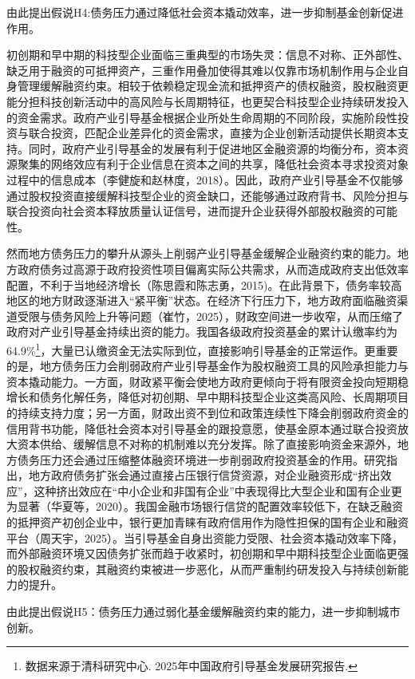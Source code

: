 由此提出假说H4:债务压力通过降低社会资本撬动效率，进一步抑制基金创新促进作用。

初创期和早中期的科技型企业面临三重典型的市场失灵：信息不对称、正外部性、缺乏用于融资的可抵押资产，三重作用叠加使得其难以仅靠市场机制作用与企业自身管理缓解融资约束。相较于依赖稳定现金流和抵押资产的债权融资，股权融资更能分担科技创新活动中的高风险与长周期特征，也更契合科技型企业持续研发投入的资金需求。政府产业引导基金根据企业所处生命周期的不同阶段，实施阶段性投资与联合投资，匹配企业差异化的资金需求，直接为企业创新活动提供长期资本支持。同时，政府产业引导基金的发展有利于促进地区金融资源的均衡分布，资本资源聚集的网络效应有利于企业信息在资本之间的共享，降低社会资本寻求投资对象过程中的信息成本（李健旋和赵林度，2018）。因此，政府产业引导基金不仅能够通过股权投资直接缓解科技型企业的资金缺口，还能够通过政府背书、风险分担与联合投资向社会资本释放质量认证信号，进而提升企业获得外部股权融资的可能性。

然而地方债务压力的攀升从源头上削弱产业引导基金缓解企业融资约束的能力。地方政府债务过高源于政府投资性项目偏离实际公共需求，从而造成政府支出低效率配置，不利于当地经济增长（陈思霞和陈志勇，2015)。在此背景下，债务率较高地区的地方财政逐渐进入“紧平衡”状态。在经济下行压力下，地方政府面临融资渠道受限与债务风险上升等问题（崔竹，2025），财政空间进一步收窄，从而压缩了政府对产业引导基金持续出资的能力。我国各级政府投资基金的累计认缴率约为64.9\%\footnote[1]{\hspace*{2em}数据来源于清科研究中心. 2025年中国政府引导基金发展研究报告.}，大量已认缴资金无法实际到位，直接影响引导基金的正常运作。更重要的是，地方债务压力会削弱政府产业引导基金作为股权融资工具的风险承担能力与资本撬动能力。一方面，财政紧平衡会使地方政府更倾向于将有限资金投向短期稳增长和债务化解任务，降低对初创期、早中期科技型企业这类高风险、长周期项目的持续支持力度；另一方面，财政出资不到位和政策连续性下降会削弱政府资金的信用背书功能，降低社会资本对引导基金的跟投意愿，使基金原本通过联合投资放大资本供给、缓解信息不对称的机制难以充分发挥。除了直接影响资金来源外，地方债务压力还会通过压缩整体融资环境进一步削弱政府投资基金的作用。研究指出，地方政府债务扩张会通过直接占压银行信贷资源，对企业融资形成“挤出效应”，这种挤出效应在“中小企业和非国有企业”中表现得比大型企业和国有企业更为显著（华夏等，2020）。我国金融市场银行信贷的配置效率较低下，在缺乏融资的抵押资产初创企业中，银行更加青睐有政府信用作为隐性担保的国有企业和融资平台（周天宇，2025）。当引导基金自身出资能力受限、社会资本撬动效率下降，而外部融资环境又因债务扩张而趋于收紧时，初创期和早中期科技型企业面临更强的股权融资约束，其融资约束被进一步恶化，从而严重制约研发投入与持续创新能力的提升。

由此提出假说H5：债务压力通过弱化基金缓解融资约束的能力，进一步抑制城市创新。
